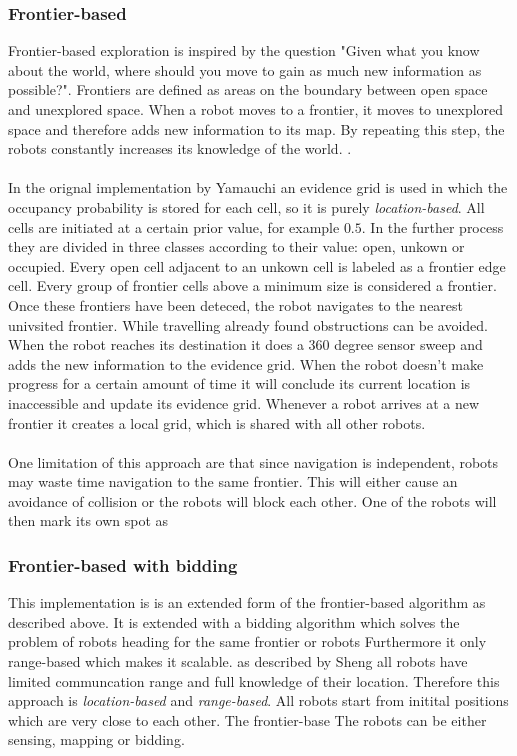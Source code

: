 	\subsubsection{Frontier-based}
	Frontier-based exploration is inspired by the question "Given what you know about the world, where should you move to gain as much new information as possible?".
	Frontiers are defined as areas on the boundary between open space and unexplored space.
	When a robot moves to a frontier, it moves to unexplored space and therefore adds new information to its map.
	By repeating this step, the robots constantly increases its knowledge of the world. \cite{yamauchi1998frontier}.\\
	\\
	In the orignal implementation by Yamauchi an evidence grid is used in which the occupancy probability is stored for each cell, so it is purely \emph{location-based}.
	All cells are initiated at a certain prior value, for example $0.5$.
	In the further process they are divided in three classes according to their value: open, unkown or occupied.
	Every open cell adjacent to an unkown cell is labeled as a frontier edge cell.
	Every group of frontier cells above a minimum size is considered a frontier.
	Once these frontiers have been deteced, the robot navigates to the nearest univsited frontier.
	While travelling already found obstructions can be avoided.
	When the robot reaches its destination it does a 360 degree sensor sweep and adds the new information to the evidence grid.
	When the robot doesn't make progress for a certain amount of time it will conclude its current location is inaccessible and update its evidence grid.
	Whenever a robot arrives at a new frontier it creates a local grid, which is shared with all other robots.\\
	\\
	One limitation of this approach are that since navigation is independent, robots may waste time navigation to the same frontier.
	This will either cause an avoidance of collision or the robots will block each other.
	One of the robots will then mark its own spot as 




	\subsubsection{Frontier-based with bidding}
	This implementation is is an extended form of the frontier-based algorithm as described above.
	It is extended with a bidding algorithm which solves the problem of robots heading for the same frontier or robots 
	Furthermore it only range-based which makes it scalable. as described by Sheng all robots have limited communcation range and full knowledge of their location.
	Therefore this approach is \emph{location-based} and \emph{range-based}.
	All robots start from initital positions which are very close to each other.
	The frontier-base
	The robots can be either sensing, mapping or bidding.





